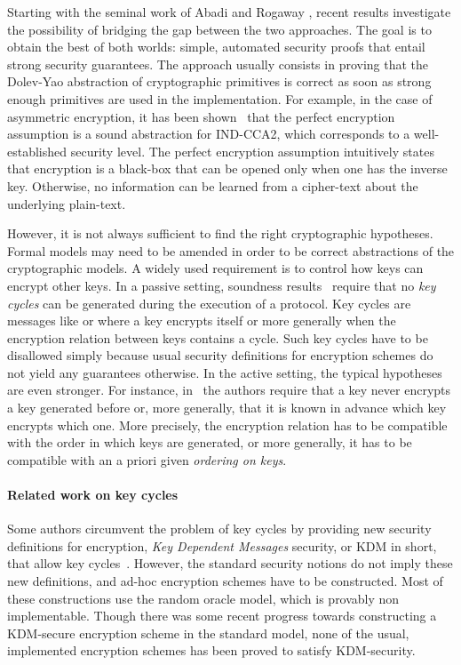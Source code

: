 \documentclass[acmtocl,acmnow]{acmtrans2m}
\begin{document}
Starting with the seminal work of Abadi and Rogaway
\cite{ARCryptology02}, recent results investigate the possibility of
bridging the gap between the two approaches.  The goal is to obtain
the best of both worlds: simple, automated security proofs that entail
strong security guarantees.  The approach usually consists in proving
that the Dolev-Yao abstraction of cryptographic primitives 
 is correct as soon as strong enough primitives are used in the
implementation.  For example, in the case of asymmetric encryption, it
has been shown~\cite{Micciancio_Warinschi_TCC04_soundness_of_formal_encryption}
that the perfect encryption assumption is a sound abstraction for
IND-CCA2, which corresponds to a well-established security level.  The
perfect encryption assumption intuitively states that encryption is a
black-box that can be opened only when one has the inverse
key. Otherwise, no information can be learned from a cipher-text about
the underlying plain-text.


However, it is not always sufficient to find the right cryptographic
hypotheses. Formal models may need to be amended in order to be
correct abstractions of the cryptographic models. A  widely used requirement is to control how keys can
encrypt other keys.  In a passive setting, soundness
results~\cite{ARCryptology02,MW04} require that no \emph{key cycles}
can be generated during the execution of a protocol. Key cycles are
messages like  or  where a key
encrypts itself or more generally when the encryption relation between
keys contains a cycle. Such key cycles have to be disallowed simply
because usual security definitions for encryption schemes do not
yield any guarantees otherwise.  In the active
setting, the typical hypotheses are even stronger.  For instance,
in~\cite{Backes_Pfitzmann_CSFW04_symmetric_encryption,cryptoeprint:2005:020}
the authors require that a key  never encrypts a key generated
before  or, more generally, that it is known in advance which key
encrypts which one. More precisely, the encryption relation has to be
compatible with the order in which keys are generated, or more
generally, it has to be compatible with an {a priori} given
\emph{ordering on keys}.

\paragraph{Related work on key cycles} 
Some authors circumvent the problem of key cycles by providing new
security definitions for encryption, \emph{Key Dependent Messages} security, or
KDM in short, that allow key
cycles~\cite{AdaoBanaHerzogScedrov-ESORICS05,backes07key}. However,
the standard security notions do not imply these new definitions, and
ad-hoc encryption schemes have to be constructed. 
Most of these constructions use the random oracle model, which
is provably non implementable. Though there was some recent
progress  \cite{hofheinz08towards} towards constructing a KDM-secure
encryption scheme in the standard model,
none of the usual, implemented encryption schemes has
been proved to satisfy KDM-security.
\end{document}

